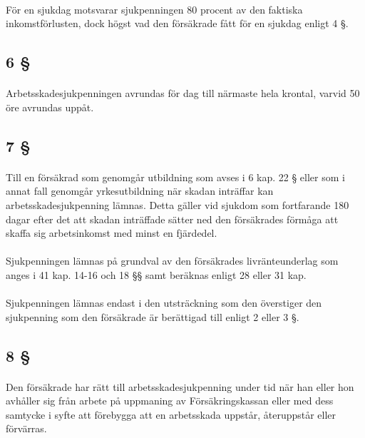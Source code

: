 \documentclass[a4paper,notitlepage,openany,10pt]{book}
\begin{document}
\paragraph*{}
För en sjukdag motsvarar sjukpenningen 80 procent av den faktiska inkomstförlusten, dock högst vad den försäkrade fått för en sjukdag enligt 4 §.
\subsection*{6 §}
\paragraph*{}
Arbetsskadesjukpenningen avrundas för dag till närmaste hela krontal, varvid 50 öre avrundas uppåt.
\subsection*{7 §}
\paragraph*{}
Till en försäkrad som genomgår utbildning som avses i 6 kap. 22 § eller som i annat fall genomgår yrkesutbildning när skadan inträffar kan arbetsskadesjukpenning lämnas. Detta gäller vid sjukdom som fortfarande 180 dagar efter det att skadan inträffade sätter ned den försäkrades förmåga att skaffa sig arbetsinkomst med minst en fjärdedel.
\paragraph*{}
Sjukpenningen lämnas på grundval av den försäkrades livränteunderlag som anges i 41 kap. 14-16 och 18 §§ samt beräknas enligt 28 eller 31 kap.
\paragraph*{}
Sjukpenningen lämnas endast i den utsträckning som den överstiger den sjukpenning som den försäkrade är berättigad till enligt 2 eller 3 §.
\subsection*{8 §}
\paragraph*{}
Den försäkrade har rätt till arbetsskadesjukpenning under tid när han eller hon avhåller sig från arbete på uppmaning av Försäkringskassan eller med dess samtycke i syfte att förebygga att en arbetsskada uppstår, återuppstår eller förvärras.
\end{document}
